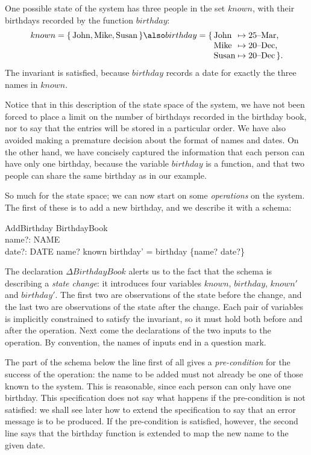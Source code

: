 One possible state of the system has three people in the set $known$,
with their birthdays recorded by the function $birthday$:
\[
	known = \{\,{\rm John, Mike, Susan}\,\} \\
\also
	birthday = \{\,\vtop{\halign{\strut#\hfil&${}\mapsto{}$#\hfil\cr
			John&  25--Mar,\cr
			Mike&  20--Dec,\cr
			Susan& 20--Dec\,\}.\cr}}
\]
The invariant is satisfied, because $birthday$ records a date for
exactly the three names in $known$.

Notice that in this description of the state space of the
system, we have not been forced to place a limit on the
number of birthdays recorded in the birthday book, 
nor  to say that the
entries will be stored in a particular order. We have also
avoided making a premature decision about the format of
names and dates. On the other hand, we have concisely
captured the information that each person can have only one
birthday, because the variable $birthday$ is a function, and
that two people can share the same birthday as in our
example.

So much for the state space; we can now start on some {\em
operations\/} on the system. The first of these is to add a
new birthday, and we describe it with a schema:
\begin{schema}{AddBirthday}
     \Delta BirthdayBook \\
     name?: NAME \\
     date?: DATE
\where
     name? \notin known
\also
     birthday' = birthday \cup \{name? \mapsto date?\}
\end{schema}
The declaration $\Delta BirthdayBook$ alerts
us to the fact that the schema is describing a {\em state change}: it
introduces four variables $known$, $birthday$, $known'$ and
$birthday'$. The first two are observations of the state before the
change, and the last two are observations of the state after the
change. Each pair of variables is implicitly constrained to satisfy
the invariant, so it must hold both before and after the operation.
Next come the declarations of the two inputs to the operation.
By convention, the names of inputs end in a question mark.

The part of the schema below the line first of all gives a {\em
pre-condition\/} for the success of the
operation: the name to be added must not already be one of those known
to the system. This is reasonable, since each person can only have one
birthday. This specification does not say what happens if the
pre-condition is not satisfied: we shall see later how to extend the
specification to say that an error message is to be produced. If the
pre-condition is satisfied, however, the second line says that the
birthday function is extended to map the new name to the given date.

